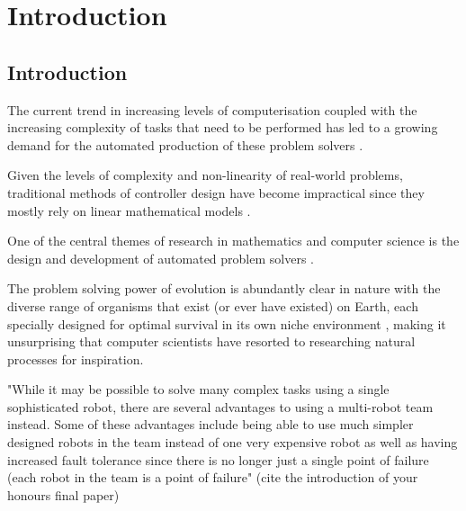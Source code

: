 
\chapter{Introduction} %

\label{Chapter1} %


\newcommand{\keyword}[1]{\textbf{#1}}
\newcommand{\tabhead}[1]{\textbf{#1}}
\newcommand{\code}[1]{\texttt{#1}}
\newcommand{\file}[1]{\texttt{\bfseries#1}}
\newcommand{\option}[1]{\texttt{\itshape#1}}


\section{Introduction}

The current trend in increasing levels of computerisation coupled with the increasing complexity of tasks that need to be performed has led to a growing demand for the automated production of these problem solvers \cite{RefWorks:33}.

Given the levels of complexity and non-linearity of real-world problems, traditional methods of controller design have become impractical since they mostly rely on linear mathematical models \cite{RefWorks:32}.

One of the central themes of research in mathematics and computer science is the design and development of automated problem solvers \cite{RefWorks:33}.

The problem solving power of evolution is abundantly clear in nature with the diverse range of organisms that exist (or ever have existed) on Earth, each specially designed for optimal survival in its own niche environment \cite{RefWorks:33}, making it unsurprising that computer scientists have resorted to researching natural processes for inspiration.

"While it may be possible to solve many complex tasks using a single sophisticated robot, there are several advantages to using a multi-robot team instead. Some of these advantages include being able to use much simpler designed robots in the team instead of one very expensive robot as well as having increased fault tolerance since there is no longer just a single point of failure (each robot in the team is a point of failure" (cite the introduction of your honours final paper)

